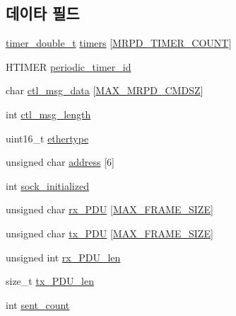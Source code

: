 \subsection*{데이타 필드}
\begin{DoxyCompactItemize}
\item 
\hyperlink{structtimer__double__t}{timer\+\_\+double\+\_\+t} \hyperlink{structmrpd__test__state_addb880c3ca1c2edfcdd2549931b13543}{timers} \mbox{[}\hyperlink{mrp__doubles_8h_ab7966dc729a73ff39170269821462858}{M\+R\+P\+D\+\_\+\+T\+I\+M\+E\+R\+\_\+\+C\+O\+U\+NT}\mbox{]}
\item 
H\+T\+I\+M\+ER \hyperlink{structmrpd__test__state_a8a983fb9f3ff1482d5e5a2a77c64cd71}{periodic\+\_\+timer\+\_\+id}
\item 
char \hyperlink{structmrpd__test__state_a167ca5a6f26ada0b2865b4dd489753d2}{ctl\+\_\+msg\+\_\+data} \mbox{[}\hyperlink{mrpd_8h_a63a4db05a55163366a16c61994e77a6f}{M\+A\+X\+\_\+\+M\+R\+P\+D\+\_\+\+C\+M\+D\+SZ}\mbox{]}
\item 
int \hyperlink{structmrpd__test__state_ae02cd1c7ca02ce1d99e22972db6565a9}{ctl\+\_\+msg\+\_\+length}
\item 
uint16\+\_\+t \hyperlink{structmrpd__test__state_aa9296c58dc24c63c4ee927db394a97d7}{ethertype}
\item 
unsigned char \hyperlink{structmrpd__test__state_aa70c068e41ae99fa44d0b66209237075}{address} \mbox{[}6\mbox{]}
\item 
int \hyperlink{structmrpd__test__state_a0ff41836d678c2a79925a176b08fccf1}{sock\+\_\+initialized}
\item 
unsigned char \hyperlink{structmrpd__test__state_aa86c1661ac8500782d7ad1ca6c1eb3d7}{rx\+\_\+\+P\+DU} \mbox{[}\hyperlink{sendmmsg__rawsock_8h_ad15d35a0d29a9dbf9324e3859ce3b008}{M\+A\+X\+\_\+\+F\+R\+A\+M\+E\+\_\+\+S\+I\+ZE}\mbox{]}
\item 
unsigned char \hyperlink{structmrpd__test__state_ae91dc00a89d8eee254abdc8dfa703bf0}{tx\+\_\+\+P\+DU} \mbox{[}\hyperlink{sendmmsg__rawsock_8h_ad15d35a0d29a9dbf9324e3859ce3b008}{M\+A\+X\+\_\+\+F\+R\+A\+M\+E\+\_\+\+S\+I\+ZE}\mbox{]}
\item 
unsigned int \hyperlink{structmrpd__test__state_a05f2959f886f1637960fd7be3a7da392}{rx\+\_\+\+P\+D\+U\+\_\+len}
\item 
size\+\_\+t \hyperlink{structmrpd__test__state_ad360819aed2594ba5819d7d147292634}{tx\+\_\+\+P\+D\+U\+\_\+len}
\item 
int \hyperlink{structmrpd__test__state_a91c97751cd15e145929c848d6ba03ff0}{sent\+\_\+count}
\item 

\end{DoxyCompactItemize}
